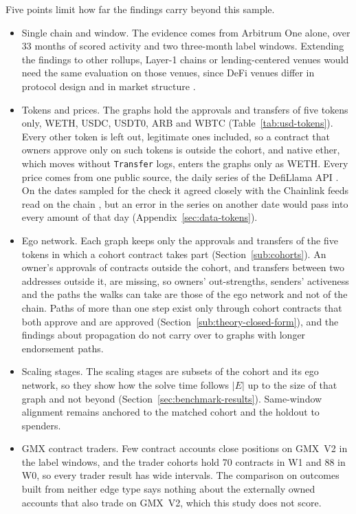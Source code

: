 
Five points limit how far the findings carry beyond this sample.

\begin{itemize}
\item Single chain and window. The evidence comes from Arbitrum One alone, over 33 months of scored activity and two three-month label windows. Extending the findings to other rollups, Layer-1 chains or lending-centered venues would need the same evaluation on those venues, since DeFi venues differ in protocol design \parencite{werner2022sok} and in market structure \parencite{schar2021defi}.
\item Tokens and prices. The graphs hold the approvals and transfers of five tokens only, WETH, USDC, USDT0, ARB and WBTC (Table~\ref{tab:usd-tokens}). Every other token is left out, legitimate ones included, so a contract that owners approve only on such tokens is outside the cohort, and native ether, which moves without \texttt{Transfer} logs, enters the graphs only as WETH. Every price comes from one public source, the daily series of the DefiLlama API \parencite{defillamanddocs}. On the dates sampled for the check it agreed closely with the Chainlink feeds read on the chain \parencite{chainlinknddatafeeds}, but an error in the series on another date would pass into every amount of that day (Appendix~\ref{sec:data-tokens}).
\item Ego network. Each graph keeps only the approvals and transfers of the five tokens in which a cohort contract takes part (Section~\ref{sub:cohorts}). An owner's approvals of contracts outside the cohort, and transfers between two addresses outside it, are missing, so owners' out-strengths, senders' activeness and the paths the walks can take are those of the ego network and not of the chain. Paths of more than one step exist only through cohort contracts that both approve and are approved (Section~\ref{sub:theory-closed-form}), and the findings about propagation do not carry over to graphs with longer endorsement paths.
\item Scaling stages. The scaling stages are subsets of the cohort and its ego network, so they show how the solve time follows $|E|$ up to the size of that graph and not beyond (Section~\ref{sec:benchmark-results}). Same-window alignment remains anchored to the matched cohort and the holdout to spenders.
\item GMX contract traders. Few contract accounts close positions on GMX~V2 in the label windows, and the trader cohorts hold 70 contracts in W1 and 88 in W0, so every trader result has wide intervals. The comparison on outcomes built from neither edge type says nothing about the externally owned accounts that also trade on GMX~V2, which this study does not score.
\end{itemize}

